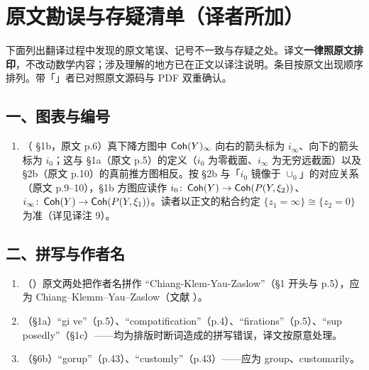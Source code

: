 \clearpage
\section{原文勘误与存疑清单（译者所加）}
\label{sec:errata}

下面列出翻译过程中发现的原文笔误、记号不一致与存疑之处。译文\textbf{一律照原文排印}，不改动数学内容；涉及理解的地方已在正文以译注说明。条目按原文出现顺序排列。带「\checkmark{}」者已对照原文源码与 PDF 双重确认。

\subsection*{一、图表与编号}
\begin{enumerate}[leftmargin=1.6em,itemsep=2pt]
\item （\checkmark{} §1b，原文 p.6）真下降方图中 $\operatorname{\mathsf{Coh}}(Y)_{\infty}$ 向右的箭头标为 $i_{\infty}$、向下的箭头标为 $i_0$；这与 §1a（原文 p.5）的定义（$i_0$ 为零截面、$i_{\infty}$ 为无穷远截面）以及 §2b（原文 p.10）的真前推方图相反。按 §2b 与「$i_0$ 镜像于 $\cup_0$」的对应关系（原文 p.9--10），§1b 方图应读作 $i_0\colon\operatorname{\mathsf{Coh}}(Y)\to\operatorname{\mathsf{Coh}}(P(Y,\xi_2))$、$i_{\infty}\colon\operatorname{\mathsf{Coh}}(Y)\to\operatorname{\mathsf{Coh}}(P(Y,\xi_1))$。读者以正文的粘合约定 $\{z_1=\infty\}\cong\{z_2=0\}$ 为准（详见译注 9）。
\end{enumerate}

\subsection*{二、拼写与作者名}
\begin{enumerate}[leftmargin=1.6em,itemsep=2pt,resume]
\item （\checkmark{}）原文两处把作者名拼作 ``Chiang-Klem-Yau-Zaslow''（§1 开头与 p.5），应为 Chiang--Klemm--Yau--Zaslow（文献 \cite{CKYZ99}）。
\item （\checkmark{}§1a）``gi ve''（p.5）、``compatification''（p.4）、``firations''（p.5）、``sup posedly''（§1c）——均为排版时断词造成的拼写错误，译文按原意处理。
\item （\checkmark{}§6b）``gorup''（p.43）、``customly''（p.43）——应为 group、customarily。
\end{enumerate}

